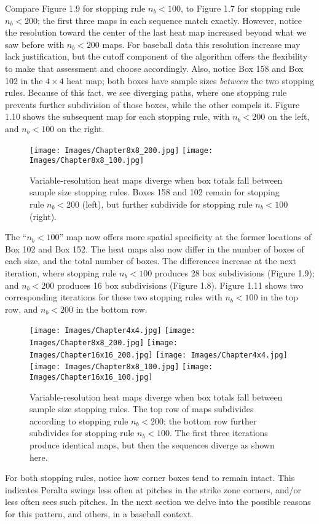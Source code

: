 Compare Figure 1.9 for stopping rule $n_{b} < 100$, to Figure 1.7 for stopping rule $n_{b} < 200$; the first three maps in each sequence match exactly. However, notice the resolution toward the center of the last heat map increased beyond what we saw before with $n_{b} < 200$ maps. For baseball data this resolution increase may lack justification, but the cutoff component of the algorithm offers the flexibility to make that assessment and choose accordingly. Also, notice Box 158 and Box 102 in the $4 \times 4$ heat map; both boxes have sample sizes {\it between} the two stopping rules. Because of this fact, we see diverging paths, where one stopping rule prevents further subdivision of those boxes, while the other compels it. Figure 1.10 shows the subsequent map for each stopping rule, with $n_{b} < 200$ on the left, and $n_{b} < 100$ on the right.
        \begin{figure}[H]
      	\centering      
      	\texttt{[image: Images/Chapter8x8\_200.jpg]}
      	\texttt{[image: Images/Chapter8x8\_100.jpg]}
      	\caption{Variable-resolution heat maps diverge when box totals fall between sample size stopping rules. Boxes 158 and 102 remain for stopping rule $n_{b} < 200$ (left), but further subdivide for stopping rule $n_{b} < 100$ (right).}
\end{figure} 
The ``$n_{b} < 100$'' map now offers more spatial specificity at the former locations of Box 102 and Box 152. The heat maps also now differ in the number of boxes of each size, and the total number of boxes.  The differences increase at the next iteration, where stopping rule $n_{b} < 100$ produces 28 box subdivisions (Figure 1.9); and $n_{b} < 200$ produces 16 box subdivisions (Figure 1.8). Figure 1.11 shows two corresponding iterations for these two stopping rules with $n_{b} < 100$ in the top row, and $n_{b} < 200$ in the bottom row.
        \begin{figure}[H]
      	\centering      
      	\texttt{[image: Images/Chapter4x4.jpg]}
      	\texttt{[image: Images/Chapter8x8\_200.jpg]}
      	\texttt{[image: Images/Chapter16x16\_200.jpg]}
      	\texttt{[image: Images/Chapter4x4.jpg]}
      	\texttt{[image: Images/Chapter8x8\_100.jpg]}
      	\texttt{[image: Images/Chapter16x16\_100.jpg]}
      	\caption{Variable-resolution heat maps diverge when box totals fall between sample size stopping rules. The top row of maps subdivides according to stopping rule $n_{b} < 200$; the bottom row further subdivides for stopping rule $n_{b} < 100$. The first three iterations produce identical maps, but then the sequences diverge as shown here.}
\end{figure}
For both stopping rules, notice how corner boxes tend to remain intact. This indicates Peralta swings less often at pitches in the strike zone corners, and/or less often sees such pitches. In the next section we delve into the possible reasons for this pattern, and others, in a baseball context.

